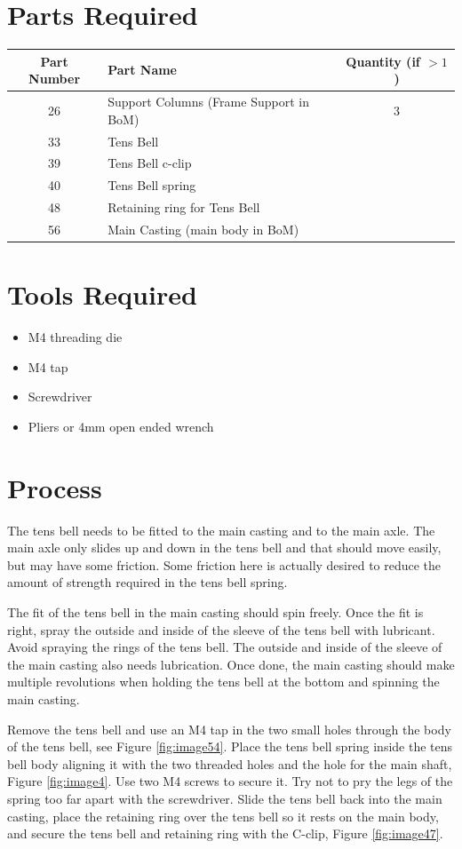 \documentclass[openany]{book}
\begin{document}
\section{Parts Required}
\begin{table}[!ht]
	\centering
	\begin{tabular}{clc}
		Part Number & Part Name & Quantity (if $>1$) \\ \hline
		26 & Support Columns (Frame Support in BoM) & 3 \\
		33 & Tens Bell & \\
		39 & Tens Bell c-clip & \\
		40 & Tens Bell spring & \\
		48 & Retaining ring for Tens Bell & \\
		56 & Main Casting (main body in BoM) & 
	\end{tabular}
\end{table}


\section{Tools Required}
\begin{itemize}
	\item M4 threading die
	\item M4 tap
	\item Screwdriver
	\item Pliers or 4mm open ended wrench
\end{itemize}

\section{Process}

The tens bell needs to be fitted to the main casting and to the main axle. The main axle only slides up and down in the tens bell and that should move easily, but may have some friction. Some friction here is actually desired to reduce the amount of strength required in the tens bell spring.

The fit of the tens bell in the main casting should spin freely. Once the fit is right, spray the outside and inside of the sleeve of the tens bell with lubricant. Avoid spraying the rings of the tens bell. The outside and inside of the sleeve of the main casting also needs lubrication. Once done, the main casting should make multiple revolutions when holding the tens bell at the bottom and spinning the main casting.

Remove the tens bell and use an M4 tap in the two small holes through the body of the tens bell, see Figure \ref{fig:image54}. Place the tens bell spring inside the tens bell body aligning it with the two threaded holes and the hole for the main shaft, Figure \ref{fig:image4}. Use two M4 screws to secure it. Try not to pry the legs of the spring too far apart with the screwdriver. Slide the tens bell back into the main casting, place the retaining ring over the tens bell so it rests on the main body, and secure the tens bell and retaining ring with the C-clip, Figure \ref{fig:image47}.
\end{document}
